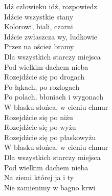 
Idź człowieku idź, rozpowiedz \tab{} \\
Idźcie wszystkie stany \tab{}  \\
Kolorowi, biali, czarni  \tab{} \\
Idźcie zwłaszcza wy, ludkowie  \tab{} \\
Przez na oścież bramy  \tab{}  \\
\hops
{} Dla wszystkich starczy miejsca   \\
 Pod wielkim dachem nieba   \\
\hops
Rozejdźcie się po drogach  \tab{} \\
Po łąkach, po rozłogach \tab{}  \\
Po polach, błoniach i wygonach  \\
W blasku słońca, w cieniu chmur   \\
\hops
{} Rozejdźcie się po niżu \tab{}  \\
 Rozejdźcie się po wyżu \tab{}  \\
 Rozejdźcie się po płaskowyżu  \\
 W blasku słońca, w cieniu chmur   \\
\hops
Dla wszystkich starczy miejsca  \\
Pod wielkim dachem nieba  \tab{}  \\
Na ziemi której ja i ty  \tab{}  \\
Nie zamienimy w bagno krwi  \tab{} 